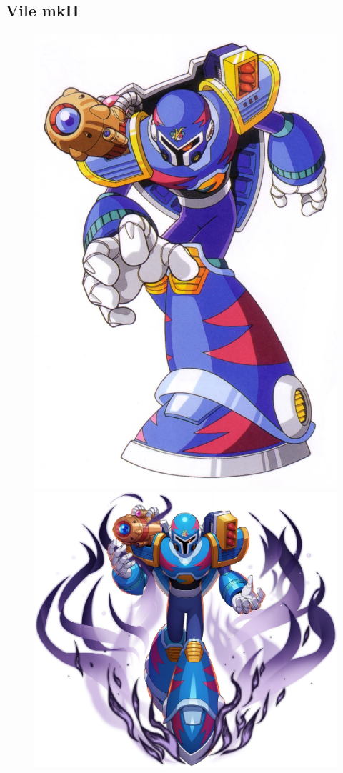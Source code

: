 \subsection{Vile mkII}\label{boss:Vile2} 
\begin{figure}[htp]
	\centering
	\includegraphics[height=\portraitsize]{figures/X3/Doppler_stages/vile2.png}
	\includegraphics[height=\portraitsize]{figures/X3/Doppler_stages/vile2_dive.png}

\end{figure}
